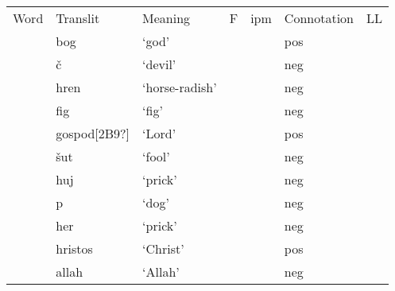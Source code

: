 \documentclass[12pt]{article}
\begin{document}
\begin{flushleft}
\tablefirsthead{}
\tablehead{}
\tabletail{}
\tablelasttail{}
\begin{supertabular}{m{0.6309598in}m{0.6295598in}m{0.7073598in}m{0.35735986in}m{0.43025985in}m{0.79065984in}m{0.62615985in}}
{\mdseries Word} &
{\mdseries Translit} &
{\mdseries Meaning} &
{\mdseries F} &
{\mdseries ipm} &
{\mdseries Connotation} &
{\mdseries LL}\\
{\mdseries {}} &
{\mdseries bog} &
{\mdseries ‘god’} &
{} &
{} &
{\mdseries pos} &
{}\\
{\mdseries {}} &
{\mdseries č} &
{\mdseries ‘devil’} &
{} &
{} &
{\mdseries neg} &
{}\\
{\mdseries {}} &
{\mdseries hren} &
{\mdseries ‘horse-radish’} &
{} &
{} &
{\mdseries neg} &
{}\\
{\mdseries {}} &
{\mdseries fig} &
{\mdseries ‘fig’} &
{} &
{} &
{\mdseries neg} &
{}\\
{\mdseries {}} &
{\mdseries gospod[2B9?]} &
{\mdseries ‘Lord’} &
{} &
{} &
{\mdseries pos} &
{}\\
{\mdseries {}} &
{\mdseries šut} &
{\mdseries ‘fool’} &
{} &
{} &
{\mdseries neg} &
{}\\
{\mdseries {}} &
{\mdseries huj} &
{\mdseries ‘prick’} &
{} &
{} &
{\mdseries neg} &
{}\\
{\mdseries {}} &
{\mdseries p} &
{\mdseries ‘dog’} &
{} &
{} &
{\mdseries neg} &
{}\\
{\mdseries {}} &
{\mdseries her} &
{\mdseries ‘prick’} &
{} &
{} &
{\mdseries neg} &
{}\\
{\mdseries {}} &
{\mdseries hristos} &
{\mdseries ‘Christ’} &
{} &
{} &
{\mdseries pos} &
{}\\
{\mdseries {}} &
{\mdseries allah} &
{\mdseries ‘Allah’} &
{} &
{} &
{\mdseries neg} &
{}\\

\end{supertabular}
\end{flushleft}
\end{document}

